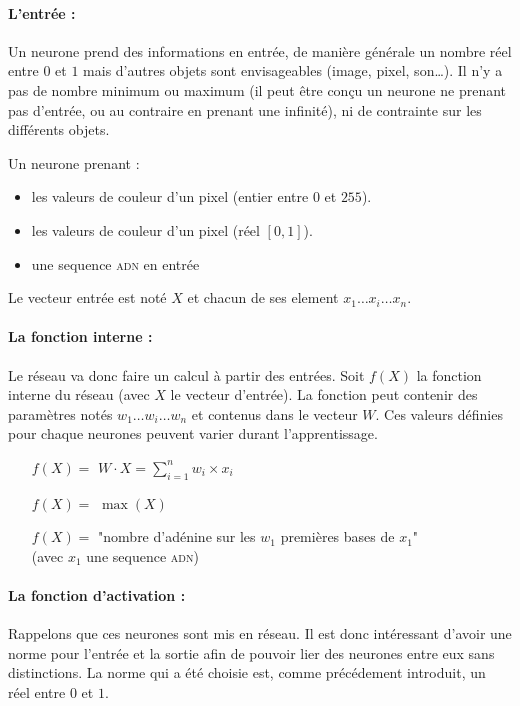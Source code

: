 \paragraph{L'entrée :}
Un neurone prend des informations en entrée, de manière générale un nombre réel entre $0$ et $1$
mais d'autres objets sont envisageables (image, pixel, son\ldots).
Il n'y a pas de nombre minimum ou maximum
(il peut être conçu un neurone ne prenant pas d'entrée, ou au contraire en prenant une infinité),
ni de contrainte sur les différents objets.
\exemle
{
Un neurone prenant :
\begin{itemize}
    \item les valeurs de couleur d'un pixel (entier entre $0$ et $255$).
    \item les valeurs de couleur d'un pixel (réel $[0, 1]$).
    \item une sequence \textsc{adn} en entrée

\end{itemize}
}
Le vecteur entrée est noté $X$ et chacun de ses element $x_1 \ldots x_i \ldots x_n$.

\paragraph{La fonction interne :}
Le réseau va donc faire un calcul à partir des entrées.
Soit $f(X)$ la fonction interne du réseau (avec $X$ le vecteur d'entrée).
La fonction peut contenir des paramètres notés $w_1 \ldots w_i \ldots w_n$ et contenus dans le vecteur $W$.
Ces valeurs définies pour chaque neurones peuvent varier durant l'apprentissage.

\exemle
{
\begin{itemize}
    \item[$f(X) =$] $W\cdot X = \sum_{i=1}^{n} w_i \times x_i $
    \item[$f(X) =$] $\max(X)$
    \item[$f(X) =$] "nombre d'adénine sur les $w_1$ premières bases de $x_1$" \\
            (avec $x_1$ une sequence \textsc{adn})
\end{itemize}
}


\paragraph{La fonction d'activation :}
Rappelons que ces neurones sont mis en réseau.
Il est donc intéressant d'avoir une norme pour l'entrée et la sortie
afin de pouvoir lier des neurones entre eux sans distinctions.
La norme qui a été choisie est, comme précédement introduit, un réel entre $0$ et $1$.


